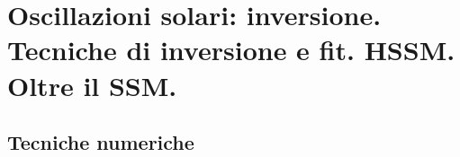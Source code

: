 {\let\clearpage\relax
\chapter{Oscillazioni solari: inversione. Tecniche di inversione e fit. HSSM. Oltre il SSM.}}
\PartialToc

\begin{refsection}


\section{Tecniche numeriche}


\end{refsection}
